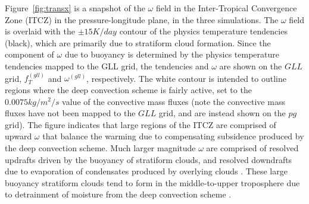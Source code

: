 \documentclass{agujournal}
\begin{document}
Figure~\ref{fig:transx} is a snapshot of the $\omega$ field in the Inter-Tropical Convergence Zone (ITCZ) in the pressure-longitude plane, in the three simulations. The $\omega$ field is overlaid with the $\pm 15 K/day$ contour of the physics temperature tendencies (black), which are primarily due to stratiform cloud formation. Since the component of $\omega$ due to buoyancy is determined by the physics temperature tendencies mapped to the GLL grid, the tendencies and $\omega$ are shown on the $GLL$ grid, $f_T^{(gll)}$ and $\omega^{(gll)}$, respectively. The white contour is intended to outline regions where the deep convection scheme is fairly active, set to the $0.0075 kg/m^2/s$ value of the convective mass fluxes (note the convective mass fluxes have not been mapped to the $GLL$ grid, and are instead shown on the $pg$ grid). The figure indicates that large regions of the ITCZ are comprised of upward $\omega$ that balance the warming due to compensating subsidence produced by the deep convection scheme. Much larger magnitude $\omega$ are comprised of resolved updrafts driven by the buoyancy of stratiform clouds, and resolved downdrafts due to evaporation of condensates produced by overlying clouds \citep{HR2018JAMES}. These large buoyancy stratiform clouds tend to form in the middle-to-upper troposphere due to detrainment of moisture from the deep convection scheme \citep{ZM1995AO}. 
\end{document}
